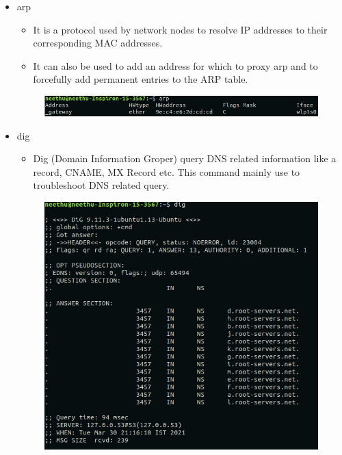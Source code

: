 \begin{itemize}
\begin{figure}[h]
        \end{figure}
    \newpage
    \item arp
        \begin{itemize}
            \item It is a protocol used by network nodes to resolve IP addresses to their corresponding MAC addresses.
            \item It can also be used to add an address for which to proxy arp and to forcefully add permanent entries to the ARP table.
        \end{itemize}
        \begin{figure}[h]
            \centering
            \includegraphics[scale=0.64]{img/e17.png}
        \end{figure}
    \item dig
        \begin{itemize}
            \item Dig (Domain Information Groper) query DNS related information like a record, CNAME, MX Record etc. This command mainly use to troubleshoot DNS related query.
        \end{itemize}
        \begin{figure}[h]
            \centering
            \includegraphics[scale=0.63]{img/e18.png}

\end{figure}
\end{itemize}
